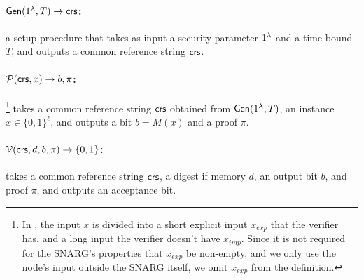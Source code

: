 \paragraph{$\Gen(1^\secpar, T)\to \var{\crs%
}$:} a setup procedure that takes as input a security parameter $1^\lambda$ and a time bound $T$, and outputs a common reference string $\mathit{ \mathsf{crs} }$.

\paragraph{$\mathcal{P}(\mathit{ \mathsf{crs} }, x)\to b, \pi$:}\footnote{
In \cite{cryptoeprint:2022/1320}, the input $x$ is divided into a short explicit input $x_{exp}$ that the verifier has, and a long input the verifier doesn't have $x_{imp}$. Since it is not required for the SNARG's properties that $x_{exp}$ be non-empty, and we only use the node's input outside the SNARG itself, we omit $x_{exp}$ from the definition.
}
takes a common reference string $\mathit{ \mathsf{crs} }$ obtained from $\mathsf{Gen}(1^{\lambda}, T)$,
an instance $x\in\{0,1\}^\ell$, and outputs a bit $b = M(x)$ and a proof $\pi$.

\paragraph{$\Ver(\var{\crs}, %
d, b, \pi)\to \set{0,1}$:} takes a common reference string $\mathit{ \mathsf{crs} }$, %
a digest if memory $d$, an output bit $b$, and proof $\pi$,
and outputs an acceptance bit.


